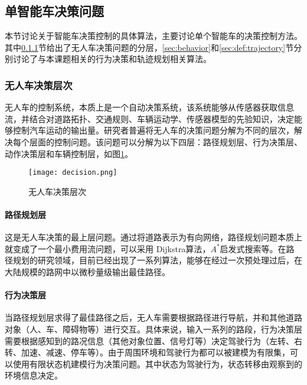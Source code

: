   \subsection{单智能车决策问题}
    \label{sec:single}
    本节讨论关于智能车决策控制的具体算法，主要讨论单个智能车的决策控制方法。其中\ref{sec:hierarchy}节给出了无人车决策问题的分层，\ref{sec:behavior}和\ref{sec:def:trajectory}节分别讨论了与本课题相关的行为决策和轨迹规划相关算法。

    \subsubsection{无人车决策层次}
    \label{sec:hierarchy}
      无人车的控制系统，本质上是一个自动决策系统，该系统能够从传感器获取信息流，并结合对道路拓扑、交通规则、车辆运动学、传感器模型的先验知识，决定能够控制汽车运动的输出量。研究者普遍将无人车的决策问题分解为不同的层次，解决每个层面的控制问题。该问题可以分解为以下四层：路径规划层、行为决策层、动作决策层和车辆控制层\cite{paden2016survey}，如图\ref{fig:decision}。

      \begin{figure}[htbp]
      \centering
      \texttt{[image: decision.png]}
      \caption{无人车决策层次\cite{paden2016survey}}
      \label{fig:decision}
      \end{figure}

      \paragraph{路径规划层} 这是无人车决策的最上层问题。通过将道路表示为有向网络，路径规划问题本质上就变成了一个最小费用流问题，可以采用 Dijkstra算法\cite{Dijkstra1959A}，$A^*$启发式搜索\cite{Nilsson1969A}等。在路径规划的研究领域，目前已经出现了一系列算法，能够在经过一次预处理过后，在大陆规模的路网中以微秒量级输出最佳路径\cite{Goldberg2003Computing,Geisberger2012Exact}。

      \paragraph{行为决策层} 当路径规划层求得了最佳路径之后，无人车需要根据路径进行导航，并和其他道路对象（人、车、障碍物等）进行交互。具体来说，输入一系列的路段，行为决策层需要根据感知到的路况信息（其他对象位置、信号灯等）决定驾驶行为（左转、右转、加速、减速、停车等）。由于周围环境和驾驶行为都可以被建模为有限集，可以使用有限状态机建模行为决策问题。其中状态为驾驶行为，状态转移由观察到的环境信息决定。

